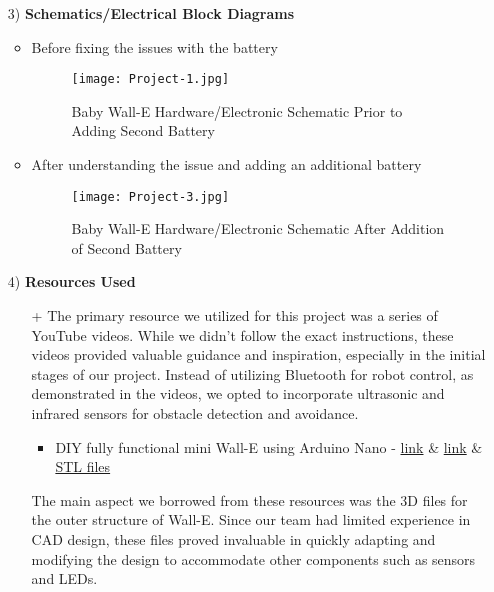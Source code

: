 \documentclass[12pt]{article}
\begin{document}
\begin{itemize}
    \item[3)] \textbf{Schematics/Electrical Block Diagrams}
    \begin{itemize}
        \item Before fixing the issues with the battery
            \begin{figure}[H]
                \centering
                \texttt{[image: Project-1.jpg]}
                \caption{Baby Wall-E Hardware/Electronic Schematic Prior to Adding Second Battery}
                \label{fig:schematic1}
            \end{figure}
        \item After understanding the issue and adding an additional battery
            \begin{figure}[H]
                \centering
                \texttt{[image: Project-3.jpg]}
                \caption{Baby Wall-E Hardware/Electronic Schematic After Addition of Second Battery}
                \label{fig:schematic2}
            \end{figure}
    \end{itemize}

    \item[4)] \textbf{Resources Used}
    \begin{enumerate}
        \item[+] The primary resource we utilized for this project was a series of YouTube videos. While we didn't follow the exact instructions, these videos provided valuable guidance and inspiration, especially in the initial stages of our project. Instead of utilizing Bluetooth for robot control, as demonstrated in the videos, we opted to incorporate ultrasonic and infrared sensors for obstacle detection and avoidance.
        \begin{itemize}
            \item DIY fully functional mini Wall-E using Arduino Nano - \href{https://www.youtube.com/watch?v=iaqVNqsvQwI}{link} \& \href{https://www.youtube.com/watch?v=Cqv2w0qYf-s}{link}
            \& \href{https://www.thingiverse.com/thing:5957438/files}{STL files}
        \end{itemize}
        
        The main aspect we borrowed from these resources was the 3D files for the outer structure of Wall-E. Since our team had limited experience in CAD design, these files proved invaluable in quickly adapting and modifying the design to accommodate other components such as sensors and LEDs.
    \end{enumerate}
        

\end{itemize}
\end{document}

